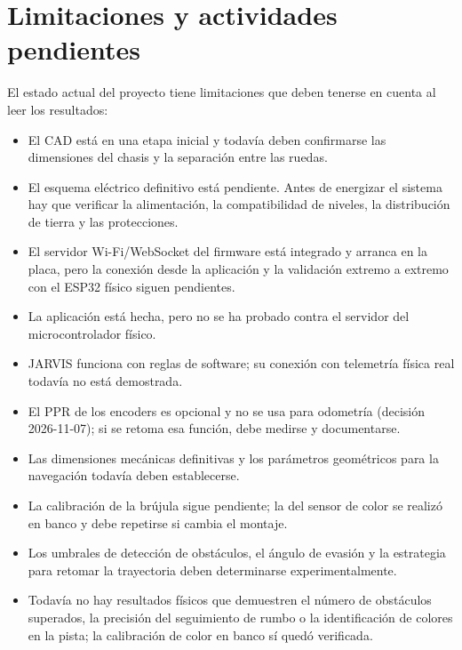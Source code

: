 \documentclass[journal]{IEEEtran}
\begin{document}
\section{Limitaciones y actividades pendientes}

El estado actual del proyecto tiene limitaciones que deben tenerse en cuenta al leer los resultados:

\begin{itemize}
    \item El CAD está en una etapa inicial y todavía deben confirmarse las dimensiones del chasis y la separación entre las ruedas.

    \item El esquema eléctrico definitivo está pendiente. Antes de energizar el sistema hay que verificar la alimentación, la compatibilidad de niveles, la distribución de tierra y las protecciones.

    \item El servidor Wi-Fi/WebSocket del firmware está integrado y arranca en la placa, pero la conexión desde la aplicación y la validación extremo a extremo con el ESP32 físico siguen pendientes.

    \item La aplicación está hecha, pero no se ha probado contra el servidor del microcontrolador físico.

    \item JARVIS funciona con reglas de software; su conexión con telemetría física real todavía no está demostrada.

    \item El PPR de los encoders es opcional y no se usa para odometría (decisión 2026-11-07); si se retoma esa función, debe medirse y documentarse.

    \item Las dimensiones mecánicas definitivas y los parámetros geométricos para la navegación todavía deben establecerse.

    \item La calibración de la brújula sigue pendiente; la del sensor de color se realizó en banco y debe repetirse si cambia el montaje.

    \item Los umbrales de detección de obstáculos, el ángulo de evasión y la estrategia para retomar la trayectoria deben determinarse experimentalmente.

    \item Todavía no hay resultados físicos que demuestren el número de obstáculos superados, la precisión del seguimiento de rumbo o la identificación de colores en la pista; la calibración de color en banco sí quedó verificada.
\end{itemize}
\end{document}
